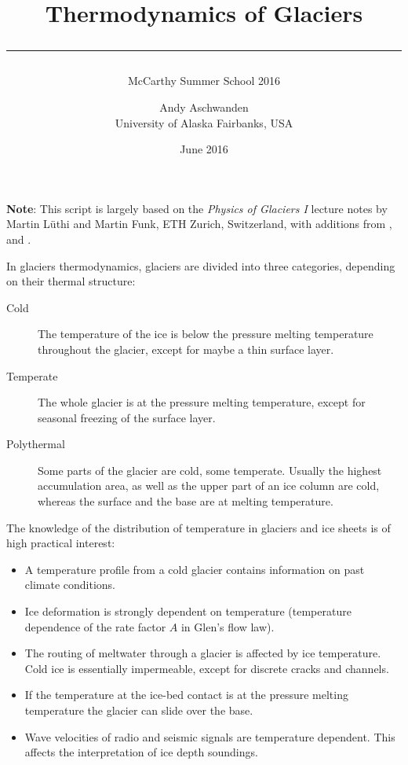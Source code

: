 \documentclass[parskip=half]{scrartcl}
\begin{document}
\title{Thermodynamics of Glaciers\\[.5em]
\rule[1.em]{\textwidth}{2pt}}
\subtitle{McCarthy Summer School 2016}

\date{June 2016}

\author{
  \small Andy Aschwanden\\[-.5em] 
 \small University of Alaska Fairbanks, USA}


\maketitle

{\bf Note}: This script is largely based on the \emph{Physics of
Glaciers I} lecture notes by Martin L\"uthi and Martin Funk, ETH
Zurich, Switzerland, with additions from \cite{GreveBlatter_disg},
\cite{Gusmeroli2010} and \cite{Aschwanden2012}.

\vspace{1em}

In glaciers thermodynamics, glaciers are divided into three categories, depending on their thermal structure:
%
\begin{description}
\item[Cold] The temperature of the ice is below the pressure melting
temperature throughout the glacier, except for maybe a thin surface
layer.
\item[Temperate] The whole glacier is at the pressure melting
temperature, except for seasonal freezing of the surface layer.
\item[Polythermal] Some parts of the glacier are cold, some temperate.
Usually the highest accumulation area, as well as the upper part of an
ice column are cold, whereas the surface and the base are at melting
temperature.
\end{description}
%
The knowledge of the distribution of temperature in glaciers and ice
sheets is of high practical interest:
%
\begin{itemize}\itemsep0ex
\item A temperature profile from a cold glacier contains information
on past climate conditions.
\item Ice deformation is strongly dependent on temperature
(temperature dependence of the rate factor $A$ in Glen's flow law).
\item The routing of meltwater through a glacier is affected by ice
temperature.  Cold ice is essentially impermeable, except for discrete
cracks and channels.
\item If the temperature at the ice-bed contact is at the pressure
melting temperature the glacier can slide over the base.
\item Wave velocities of radio and seismic signals are temperature
dependent. This affects the interpretation of ice depth soundings.
\end{itemize}
\end{document}
